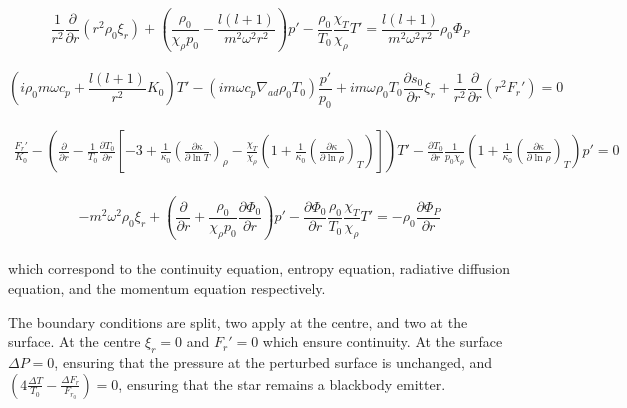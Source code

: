 \documentclass[a0,portrait]{a0poster}
\begin{document}
\begin{multicols}{2}
\small
\begin{equation} \label{eq:cont_osc}
\frac{1}{r^{2}} \frac{\partial}{\partial r} ( r^{2} \rho_{0} \xi_{r} )  
+ \left( \frac{\rho_{0}}{\chi_{\rho} p_{0}} - \frac{l (l+1)}{m^{2} \omega^{2} r^{2}} \right) p'
- \frac{\rho_{0}}{T_{0}} \frac{\chi_{T}}{\chi_{\rho}} T'
=
\frac{l (l+1)}{m^{2} \omega^{2} r^{2}} \rho_{0} \Phi_{P}
\end{equation}
\\
\begin{equation} \label{eq:ent_osc}
\left( i \rho_{0} m \omega c_{p}  + \frac{l (l+1)}{r^{2}} K_{0} \right) T'
- \left( i m \omega c_{p} \nabla_{ad} \rho_{0} T_{0}  \right) \frac{p'}{p_{0}}
+ i m \omega \rho_{0} T_{0} \frac{\partial s_{0}}{\partial r} \xi_{r}
+ \frac{1}{r^{2}} \frac{\partial}{\partial r} ( r^{2} F_{r}')
=
0
\end{equation}
\\
\begin{multline} \label{eq:flux_osc}
 \frac{F_{r}'}{K_{0}}
- \left( \frac{\partial}{\partial r} - \frac{1}{T_{0}} \frac{\partial T_{0}}{\partial r} \left[ -3 + \frac{1}{\kappa_{0}} \left( \frac{\partial \kappa}{\partial \ln T} \right)_{\rho} - \frac{\chi_{T}}{\chi_{\rho}} \left( 1 + \frac{1}{\kappa_{0}} \left( \frac{\partial \kappa}{\partial \ln \rho} \right)_{T} \right) \right] \right) T' 
- \frac{\partial T_{0}}{\partial r} \frac{1}{p_{0} \chi_{\rho}} \left( 1 + \frac{1}{\kappa_{0}} \left( \frac{\partial \kappa}{\partial \ln \rho} \right)_{T} \right) p'
=
0
\end{multline}
\\
\begin{equation} \label{eq:mom_osc}
- m^{2} \omega^{2} \rho_{0} \xi_{r} 
+ \left( \frac{\partial}{\partial r} + \frac{\rho_{0}}{\chi_{\rho} p_{0}} \frac{\partial \Phi_{0}}{\partial r} \right) p'
-  \frac{\partial \Phi_{0}}{\partial r} \frac{\rho_{0}}{T_{0}} \frac{\chi_{T}}{\chi_{\rho}} T'
=
- \rho_{0} \frac{\partial \Phi_{P}}{\partial r}
\end{equation}
\\
\normalsize
which correspond to the continuity equation, entropy equation, radiative diffusion equation, and the momentum equation respectively.


The boundary conditions are split, two apply at the centre, and two at the surface. At the centre $\xi_{r} = 0$ and $F_{r}' = 0$ which ensure continuity. At the surface $\Delta P = 0$, ensuring that the pressure at the perturbed surface is unchanged, and $\left( 4 \frac{\Delta T}{T_{0}} - \frac{\Delta F_{r}}{F_{r_{0}}} \right) = 0$, ensuring that the star remains a blackbody emitter.


\end{multicols}
\end{document}
